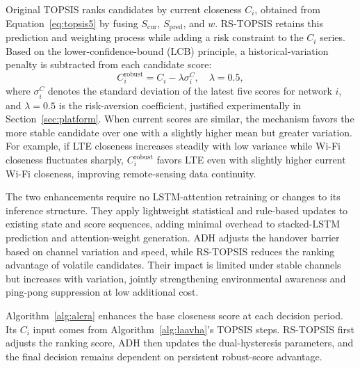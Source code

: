 \documentclass[remotesensing,article,submit,moreauthors]{Definitions/mdpi}
\begin{document}
Original TOPSIS ranks candidates by current closeness $C_i$, obtained from Equation~\eqref{eq:topsis5} by fusing $S_{\mathrm{cur}}$, $S_{\mathrm{pred}}$, and $w$. RS-TOPSIS retains this prediction and weighting process while adding a risk constraint to the $C_i$ series. Based on the lower-confidence-bound (LCB) principle, a historical-variation penalty is subtracted from each candidate score:
\begin{equation}
C_i^{\mathrm{robust}}=C_i-\lambda\sigma_i^C,\quad \lambda=0.5,
\label{eq:rstopsis}
\end{equation}
where $\sigma_i^C$ denotes the standard deviation of the latest five scores for network $i$, and $\lambda=0.5$ is the risk-aversion coefficient, justified experimentally in Section~\ref{sec:platform}. When current scores are similar, the mechanism favors the more stable candidate over one with a slightly higher mean but greater variation. For example, if LTE closeness increases steadily with low variance while Wi-Fi closeness fluctuates sharply, $C_i^{\mathrm{robust}}$ favors LTE even with slightly higher current Wi-Fi closeness, improving remote-sensing data continuity.

The two enhancements require no LSTM-attention retraining or changes to its inference structure. They apply lightweight statistical and rule-based updates to existing state and score sequences, adding minimal overhead to stacked-LSTM prediction and attention-weight generation. ADH adjusts the handover barrier based on channel variation and speed, while RS-TOPSIS reduces the ranking advantage of volatile candidates. Their impact is limited under stable channels but increases with variation, jointly strengthening environmental awareness and ping-pong suppression at low additional cost.

Algorithm~\ref{alg:alera} enhances the base closeness score at each decision period. Its $C_i$ input comes from Algorithm~\ref{alg:laavha}'s TOPSIS steps. RS-TOPSIS first adjusts the ranking score, ADH then updates the dual-hysteresis parameters, and the final decision remains dependent on persistent robust-score advantage.
\end{document}

